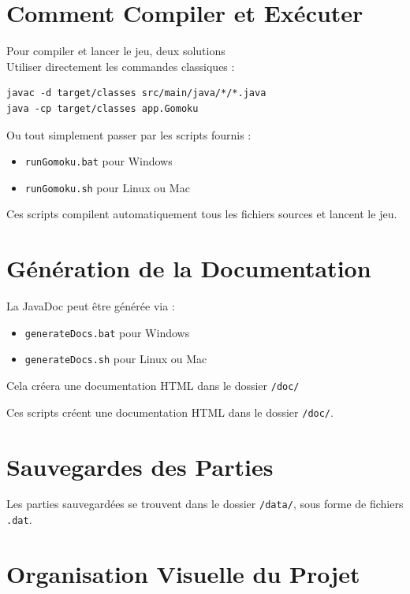 \documentclass[a4paper,11pt]{article}
\begin{document}
\section{Comment Compiler et Exécuter}

Pour compiler et lancer le jeu, deux solutions \\
Utiliser directement les commandes classiques :
\begin{lstlisting}
javac -d target/classes src/main/java/*/*.java
java -cp target/classes app.Gomoku
\end{lstlisting}

Ou tout simplement passer par les scripts fournis :

\begin{itemize}
        \item \texttt{runGomoku.bat} pour Windows
        \item \texttt{runGomoku.sh} pour Linux ou Mac
    \end{itemize}

Ces scripts compilent automatiquement tous les fichiers sources et lancent le jeu.
\newpage

\section{G\'en\'eration de la Documentation}

La JavaDoc peut \^etre g\'en\'er\'ee via :
\begin{itemize}
    \item \texttt{generateDocs.bat} pour Windows
    \item \texttt{generateDocs.sh} pour Linux ou Mac
\end{itemize}
Cela cr\'eera une documentation HTML dans le dossier \texttt{/doc/}

Ces scripts créent une documentation HTML dans le dossier \texttt{/doc/}.

\section{Sauvegardes des Parties}

Les parties sauvegard\'ees se trouvent dans le dossier \texttt{/data/}, sous forme de fichiers \texttt{.dat}.

\vspace{15mm}
\section{Organisation Visuelle du Projet}
\end{document}
